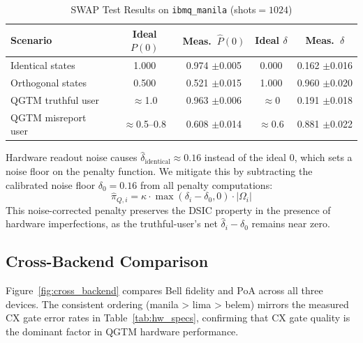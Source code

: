\begin{table}[!t]
\centering
\caption{SWAP Test Results on \texttt{ibmq\_manila} (shots$=1024$)}
\label{tab:swap_results}
\renewcommand{\arraystretch}{1.35}
\begin{tabular}{lcccc}
\toprule
\textbf{Scenario} & \textbf{Ideal $P(0)$} & \textbf{Meas.\ $\hat{P}(0)$} &
\textbf{Ideal $\delta$} & \textbf{Meas.\ $\hat{\delta}$}\\
\midrule
Identical states     & 1.000 & 0.974 $\pm$0.005 & 0.000 & 0.162 $\pm$0.016\\
Orthogonal states    & 0.500 & 0.521 $\pm$0.015 & 1.000 & 0.960 $\pm$0.020\\
\midrule
QGTM truthful user   & $\approx$1.0 & 0.963 $\pm$0.006 & $\approx$0 & 0.191 $\pm$0.018\\
QGTM misreport user  & $\approx$0.5--0.8 & 0.608 $\pm$0.014 & $\approx$0.6 & 0.881 $\pm$0.022\\
\bottomrule
\end{tabular}
\end{table}

\noindent Hardware readout noise causes $\hat{\delta}_{\text{identical}} \approx 0.16$
instead of the ideal 0, which sets a noise floor on the penalty function.
We mitigate this by subtracting the calibrated noise floor $\delta_0 = 0.16$
from all penalty computations:
\begin{equation}
  \hat{\pi}_{Q,i} = \kappa \cdot \max(\delta_i - \delta_0, 0) \cdot |\Omega_i|
  \label{eq:hw_penalty}
\end{equation}
This noise-corrected penalty preserves the DSIC property in the presence of
hardware imperfections, as the truthful-user's net $\hat{\delta}_i - \delta_0$
remains near zero.

\subsection{Cross-Backend Comparison}
\label{subsec:cross_backend}

Figure~\ref{fig:cross_backend} compares Bell fidelity and PoA across all three
devices. The consistent ordering (manila > lima > belem) mirrors the measured
CX gate error rates in Table~\ref{tab:hw_specs}, confirming that CX gate quality
is the dominant factor in QGTM hardware performance.

